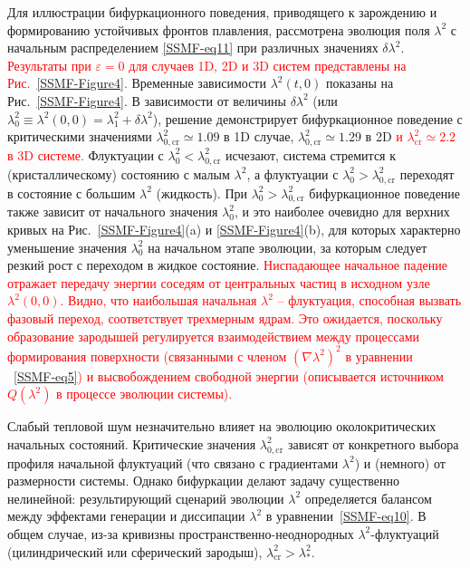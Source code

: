 Для иллюстрации бифуркационного поведения, приводящего к зарождению и формированию устойчивых фронтов плавления, рассмотрена эволюция поля $\lambda^2$ с начальным распределением \eqref{SSMF-eq11} при различных значениях $ \delta\lambda^2$.
\textcolor{red}{Результаты при $ \varepsilon = 0 $ для случаев 1D, 2D и 3D систем представлены на Рис.~\ref{SSMF-Figure4}.}
Временные зависимости $\lambda^2(t, 0) $ показаны на Рис.~\ref{SSMF-Figure4}.
В зависимости от величины $\delta\lambda^2$ (или $\lambda_0^2 \equiv \lambda^2(0,0)=\lambda_1^2 + \delta \lambda^2$), решение демонстрирует бифуркационное поведение с критическими значениями $\lambda^2_{0,\mathrm{cr}} \simeq 1.09$ в 1D случае, $\lambda^2_{0,\mathrm{cr}}\simeq 1.29$ в 2D \textcolor{red}{и $\lambda^2_{\mathrm{cr}}\simeq 2.2$ в 3D системе.}
Флуктуации с $ \lambda_0 ^ 2 <\lambda ^ 2_ {0, \mathrm{cr}} $ исчезают, система стремится к (кристаллическому) состоянию с малым $\lambda^2$, а флуктуации с $\lambda_0^2> \lambda^2_{0, \mathrm{cr}}$ переходят в состояние с большим $\lambda^2$ (жидкость).
При $\lambda_0^2>\lambda^2_{0, \mathrm{cr}}$ бифуркационное поведение также зависит от начального значения $\lambda_0^2$, и это наиболее очевидно для верхних кривых на Рис.~\ref{SSMF-Figure4}(a) и \ref{SSMF-Figure4}(b), для которых характерно уменьшение значения $ \lambda_0^2 $ на начальном этапе эволюции, за которым следует резкий рост с переходом в жидкое состояние.
\textcolor{red}{Ниспадающее начальное падение отражает передачу энергии соседям от центральных частиц в исходном узле $\lambda^2 (0,0)$. Видно, что наибольшая начальная $\lambda ^ 2$ -- флуктуация, способная вызвать фазовый переход, соответствует трехмерным ядрам. Это ожидается, поскольку образование зародышей регулируется взаимодействием между процессами формирования поверхности (связанными с членом $(\nabla \lambda ^ 2) ^ 2$ в уравнении ~\eqref{SSMF-eq5}) и высвобождением свободной энергии (описывается источником $Q (\lambda ^ 2)$ в процессе эволюции системы).}

Слабый тепловой шум незначительно влияет на эволюцию околокритических начальных состояний.
Критические значения $\lambda^2_{0,\mathrm{cr}}$ зависят от конкретного выбора профиля начальной флуктуаций (что связано с градиентами $\lambda^2$) и (немного) от размерности системы.
Однако бифуркации делают задачу существенно нелинейной:
результирующий сценарий эволюции $\lambda^2$ определяется балансом между эффектами генерации и диссипации $\lambda^2$ в уравнении~\eqref{SSMF-eq10}.
В общем случае, из-за кривизны пространственно-неоднородных $\lambda^2$-флуктуаций (цилиндрический или сферический зародыш), $\lambda_{\mathrm{cr}}^2 > \lambda_\ast^2$.





